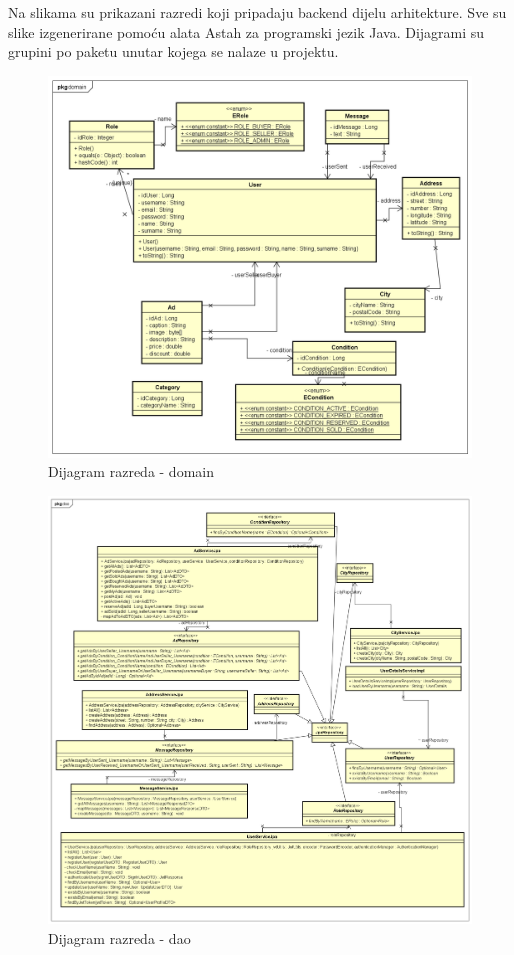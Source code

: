 		Na slikama su prikazani razredi koji pripadaju backend dijelu arhitekture. Sve su slike izgenerirane pomoću alata Astah za programski jezik Java. Dijagrami su grupini po paketu unutar kojega se nalaze u projektu.
		
			
			\begin{figure}[H]
				\includegraphics[scale=0.5]{slike/Domain.PNG} %
				\centering
				\caption{Dijagram razreda - domain}
				\label{fig:Domain}
			\end{figure}
		
		\begin{figure}[H]
			\includegraphics[scale=0.4]{slike/Dao.PNG} %
			\centering
			\caption{Dijagram razreda - dao}
			\label{fig:Dao}
		\end{figure}
	

